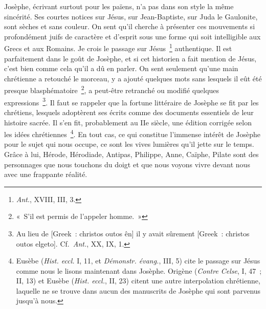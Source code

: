 \documentclass[french,twoside]{book} %
\begin{document}
Josèphe, écrivant surtout pour les païens, n’a pas dans son style la même sincérité. Ses courtes notices sur Jésus, sur Jean-Baptiste, sur Juda le Gaulonite, sont sèches et sans couleur. On sent qu’il cherche à présenter ces mouvements si profondément juifs de caractère et d’esprit sous une forme qui soit intelligible aux Grecs et aux Romains. Je crois le passage sur Jésus \footnote{{\itshape Ant}., XVIII, III, 3.} authentique. Il est parfaitement dans le goût de Josèphe, et si cet historien a fait mention de Jésus, c’est bien comme cela qu’il a dû en parler. On sent seulement qu’une main chrétienne a retouché le morceau, y a ajouté quelques mots sans lesquels il eût été presque blasphématoire \footnote{« S’il est permis de l’appeler homme. »}, a peut-être retranché ou modifié quelques expressions \footnote{ Au lieu de [Greek : christos outos ên] il y avait sûrement [Greek : christos outos elgeto]. Cf. {\itshape Ant.}, XX, IX, 1.}. Il faut se rappeler que la fortune littéraire de Josèphe se fit par les chrétiens, lesquels adoptèrent ses écrits comme des documents essentiels de leur histoire sacrée. Il s’en fit, probablement au IIe siècle, une édition corrigée selon les idées chrétiennes \footnote{ Eusèbe ({\itshape Hist. eccl.} I, 11, et {\itshape Démonstr. évang.}, III, 5) cite le passage sur Jésus comme nous le lisons maintenant dans Josèphe. Origène ({\itshape Contre Celse}, I, 47 ; II, 13) et Eusèbe ({\itshape Hist. eccl.}, II, 23) citent une autre interpolation chrétienne, laquelle ne se trouve dans aucun des manuscrits de Josèphe qui sont parvenus jusqu’à nous.}. En tout cas, ce qui constitue l’immense intérêt de Josèphe pour le sujet qui nous occupe, ce sont les vives lumières qu’il jette sur le temps. Grâce à lui, Hérode, Hérodiade, Antipas, Philippe, Anne, Caïphe, Pilate sont des personnages que nous touchons du doigt et que nous voyons vivre devant nous avec une frappante réalité.\par
\end{document}
